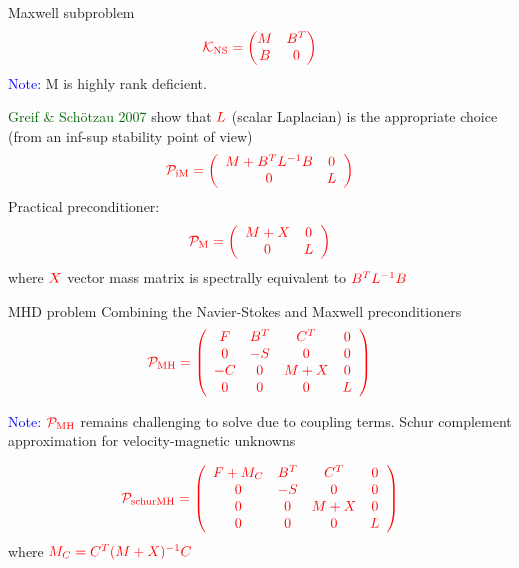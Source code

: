 \documentclass[12pt]{beamer}
\newcommand{\gr}[1]{\textcolor{darkgreen} {#1}}
\newcommand{\re}[1]{{\textcolor{red}       {#1}}}
\newcommand{\bl}[1]{{\textcolor{blue}{#1}}}
\begin{document}
\begin{frame}{Maxwell subproblem}
$$\re{\mathcal{K}_{\rm NS}=\begin{pmatrix}
M & B^T \\
B & 0
\end{pmatrix}}$$
\bl{Note:} M is highly rank deficient.

\gr{Greif \& Sch{\"o}tzau 2007} show that $\re{L}$ (scalar Laplacian) is the appropriate choice (from an inf-sup stability point of view)
$$\re{\mathcal{P}_{\rm iM}=\left(\begin{array}{cc}
M+B^T L^{-1} B & 0 \\
0 & L
\end{array}\right)}$$
\pause
Practical preconditioner:
$$\re{\mathcal{P}_{\rm M}=\left(\begin{array}{cc}
M+X & 0 \\
0 & L
\end{array}\right)}$$
where $\re{X}$ vector mass matrix is spectrally equivalent to $\re{B^T L^{-1} B}$
\end{frame}


\begin{frame}{MHD problem}
  Combining the Navier-Stokes and Maxwell preconditioners
  $$\re{\mathcal{P}_{\rm MH} =
  \left(
  \begin{array}{cccc}
  F  & B^T & C^T & 0\\
  0 & -{S} & 0 & 0 \\
  -C & 0 & M+X & 0\\
  0 & 0 & 0 & L
  \end{array}
  \right)}$$

\vspace{2mm}

\bl{Note:} $\re{{\mathcal{P}_{\rm MH}}}$ remains challenging to solve due to coupling terms. Schur complement approximation for velocity-magnetic unknowns

$$\re{\mathcal{P}_{\rm schurMH} =
\left(
\begin{array}{cccc}
F  + M_C & B^T & C^T & 0\\
0 & -{S} & 0 & 0 \\
0 & 0 & M+X & 0\\
0 & 0 & 0 & L
\end{array}
\right)}$$
where $\re{M_C = C^T (M + X)^{-1}C}$
\end{frame}
\end{document}
